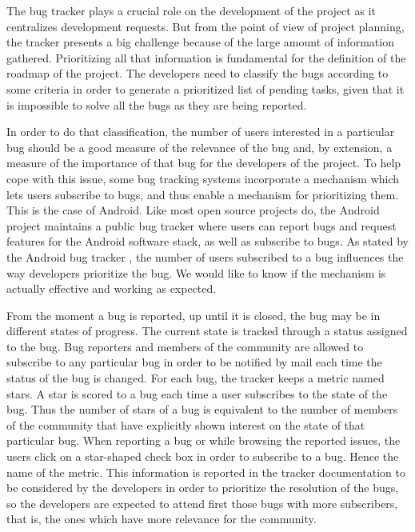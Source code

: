 \documentclass[10pt, conference, compsocconf]{IEEEtran}
\begin{document}
The bug tracker plays a crucial role on the development of the project as it centralizes development requests. But from the point of view of project planning, the tracker presents a big challenge because of the large amount of information gathered. Prioritizing all that information is fundamental for the definition of the roadmap of the project. The developers need to classify the bugs according to some criteria in order to generate a prioritized list of pending tasks, given that it is impossible to solve all the bugs as they are being reported.

In order to do that classification, the number of users interested in a particular bug should be a good measure of the relevance of the bug and, by extension, a measure of the importance of that bug for the developers of the project. To help cope with this issue, some bug tracking systems incorporate a mechanism which lets users subscribe to bugs, and thus enable a mechanism for prioritizing them. This is the case of Android. Like most open source projects do, the Android project maintains a public bug tracker where users can report bugs and request features for the Android software stack, as well as subscribe to bugs. As stated by the Android bug tracker \cite{ReportBugs}, the number of users subscribed to a bug influences the way developers prioritize the bug. We would like to know if the mechanism is actually effective and working as expected.

From the moment a bug is reported, up until it is closed, the bug may be in different states of progress. The current state is tracked through a status assigned to the bug. Bug reporters and members of the community are allowed to subscribe to any particular bug in order to be notified by mail each time the status of the bug is changed.  For each bug, the tracker keeps a metric named stars. A star is scored to a bug each time a user subscribes to the state of the bug. Thus the number of stars of a bug is equivalent to the number of members of the community that have explicitly shown interest on the state of that particular bug. When reporting a bug or  while browsing the reported issues, the users click on a star-shaped check box in order to subscribe to a bug. Hence the name of the metric. This information is reported in the tracker documentation to be considered by the developers in order to prioritize the resolution of the bugs, so the developers are expected to attend first those bugs with more subscribers, that is, the ones which have more relevance for the community.
\end{document}
